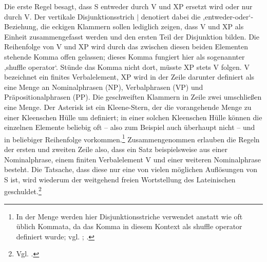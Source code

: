 \documentclass[12pt,a4paper]{article}
\begin{document}


Die erste Regel besagt, dass S entweder durch V und XP ersetzt wird oder nur durch V. Der vertikale Disjunktionsstrich $\mid$ denotiert dabei die ,entweder-oder‘-Beziehung, die eckigen Klammern sollen lediglich zeigen, dass V und XP als Einheit zusammengefasst werden und den ersten Teil der Disjunktion bilden. Die Reihenfolge von V und XP wird durch das zwischen diesen beiden Elementen stehende Komma offen gelassen; dieses Komma fungiert hier als sogenannter ,shuffle operator‘. Stünde das Komma nicht dort, müsste XP stets V folgen. V bezeichnet ein finites Verbalelement, XP wird in der Zeile darunter definiert als eine Menge an Nominalphrasen (NP), Verbalphrasen (VP) und Präpositionalphrasen (PP). Die geschweiften Klammern in Zeile zwei umschließen eine Menge. Der Asterisk ist ein Kleene-Stern, der die vorangehende Menge zu einer Kleenschen Hülle um definiert; in einer solchen Kleenschen Hülle können die einzelnen Elemente beliebig oft -- also zum Beispiel auch überhaupt nicht -- und in beliebiger Reihenfolge vorkommen.\footnote{In der Menge werden hier Disjunktionsstriche verwendet anstatt wie oft üblich Kommata, da das Komma in diesem Kontext als shuffle operator definiert wurde; vgl. \cite[26]{Skript}; \cite{Snijders}.} Zusammengenommen erlauben die Regeln der ersten und zweiten Zeile also, dass ein Satz beispielsweise aus einer Nominalphrase, einem finiten Verbalelement V und einer weiteren Nominalphrase besteht. Die Tatsache, dass diese nur eine von vielen möglichen Auflösungen von S ist, wird wiederum der weitgehend freien Wortstellung des Lateinischen geschuldet.\footnote{Vgl. \cite[19]{Rohrer}.}
\end{document}
